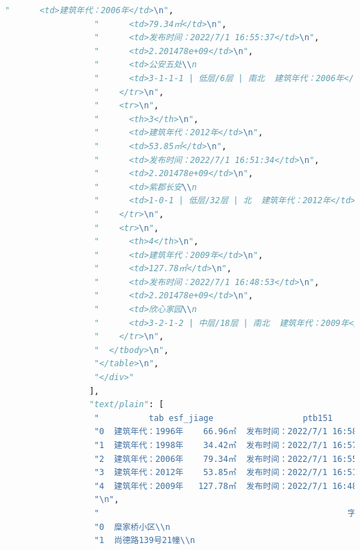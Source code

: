 \documentclass[withoutpreface,bwprint]{cumcmthesis} %
\begin{document}
\begin{appendices}
\begin{lstlisting}[language=Python]
                  "      <td>建筑年代：2006年</td>\n",
                  "      <td>79.34㎡</td>\n",
                  "      <td>发布时间：2022/7/1 16:55:37</td>\n",
                  "      <td>2.201478e+09</td>\n",
                  "      <td>公安五处\\n                                        ...</td>\n",
                  "      <td>3-1-1-1 | 低层/6层 | 南北  建筑年代：2006年</td>\n",
                  "    </tr>\n",
                  "    <tr>\n",
                  "      <th>3</th>\n",
                  "      <td>建筑年代：2012年</td>\n",
                  "      <td>53.85㎡</td>\n",
                  "      <td>发布时间：2022/7/1 16:51:34</td>\n",
                  "      <td>2.201478e+09</td>\n",
                  "      <td>紫郡长安\\n                                        ...</td>\n",
                  "      <td>1-0-1 | 低层/32层 | 北  建筑年代：2012年</td>\n",
                  "    </tr>\n",
                  "    <tr>\n",
                  "      <th>4</th>\n",
                  "      <td>建筑年代：2009年</td>\n",
                  "      <td>127.78㎡</td>\n",
                  "      <td>发布时间：2022/7/1 16:48:53</td>\n",
                  "      <td>2.201478e+09</td>\n",
                  "      <td>欣心家园\\n                                        ...</td>\n",
                  "      <td>3-2-1-2 | 中层/18层 | 南北  建筑年代：2009年</td>\n",
                  "    </tr>\n",
                  "  </tbody>\n",
                  "</table>\n",
                  "</div>"
                 ],
                 "text/plain": [
                  "          tab esf_jiage                  ptb151           编号2  \\\n",
                  "0  建筑年代：1996年    66.96㎡  发布时间：2022/7/1 16:58:31  2.201478e+09   \n",
                  "1  建筑年代：1998年    34.42㎡  发布时间：2022/7/1 16:57:11  2.201478e+09   \n",
                  "2  建筑年代：2006年    79.34㎡  发布时间：2022/7/1 16:55:37  2.201478e+09   \n",
                  "3  建筑年代：2012年    53.85㎡  发布时间：2022/7/1 16:51:34  2.201478e+09   \n",
                  "4  建筑年代：2009年   127.78㎡  发布时间：2022/7/1 16:48:53  2.201478e+09   \n",
                  "\n",
                  "                                                  字段  \\\n",
                  "0  糜家桥小区\\n                                       ...   \n",
                  "1  尚德路139号21幢\\n                                  ...   \n",

\end{lstlisting}
\end{appendices}
\end{document}
